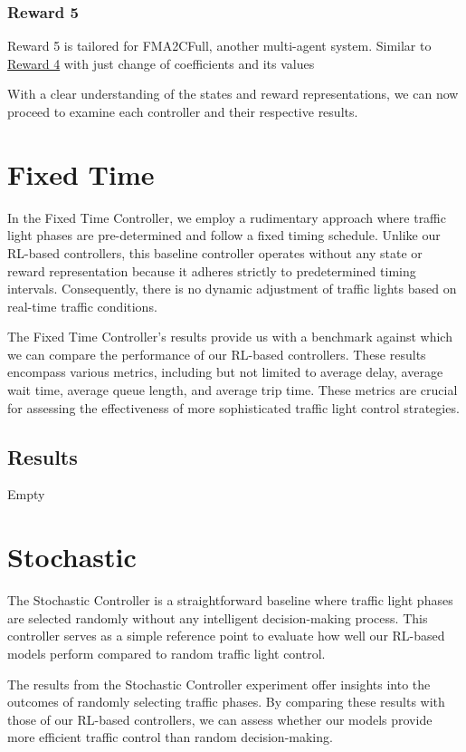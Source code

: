     
\subsubsection{Reward 5} \label{subsec:reward-5}
Reward 5 is tailored for FMA2CFull, another multi-agent system. Similar to \hyperref[subsec:reward-4]{Reward 4} with just change of coefficients and its values

With a clear understanding of the states and reward representations, we can now proceed to examine each controller and their respective results.

    
\section{Fixed Time}
In the Fixed Time Controller, we employ a rudimentary approach where traffic light phases are pre-determined and follow a fixed timing schedule. Unlike our RL-based controllers, this baseline controller operates without any state or reward representation because it adheres strictly to predetermined timing intervals. Consequently, there is no dynamic adjustment of traffic lights based on real-time traffic conditions.

The Fixed Time Controller's results provide us with a benchmark against which we can compare the performance of our RL-based controllers. These results encompass various metrics, including but not limited to average delay, average wait time, average queue length, and average trip time. These metrics are crucial for assessing the effectiveness of more sophisticated traffic light control strategies.

\subsection{Results}
Empty

\section{Stochastic}
The Stochastic Controller is a straightforward baseline where traffic light phases are selected randomly without any intelligent decision-making process. This controller serves as a simple reference point to evaluate how well our RL-based models perform compared to random traffic light control.

The results from the Stochastic Controller experiment offer insights into the outcomes of randomly selecting traffic phases. By comparing these results with those of our RL-based controllers, we can assess whether our models provide more efficient traffic control than random decision-making.

